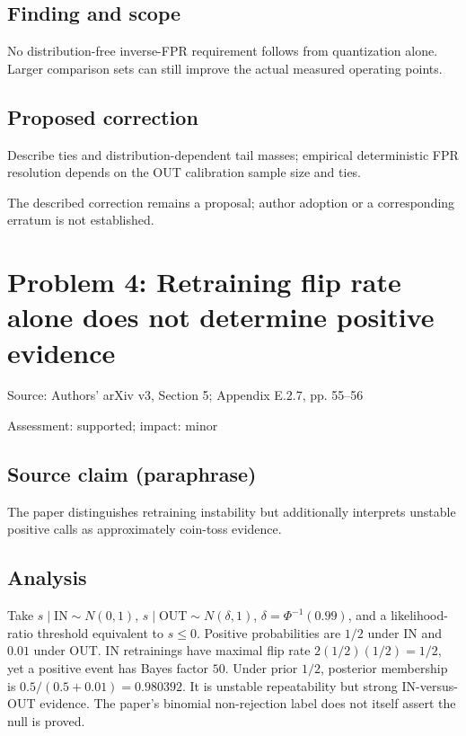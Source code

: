 \documentclass[11pt]{article}
\begin{document}
\subsection*{Finding and scope}

No distribution-free inverse-FPR requirement follows from quantization alone. Larger comparison sets can still improve the actual measured operating points.

\subsection*{Proposed correction}

Describe ties and distribution-dependent tail masses; empirical deterministic FPR resolution depends on the OUT calibration sample size and ties.

The described correction remains a proposal; author adoption or a corresponding erratum is not established.

\section*{Problem 4: Retraining flip rate alone does not determine positive evidence}

Source: Authors’ arXiv v3, Section 5; Appendix E.2.7, pp. 55–56

Assessment: supported; impact: minor

\subsection*{Source claim (paraphrase)}

The paper distinguishes retraining instability but additionally interprets unstable positive calls as approximately coin-toss evidence.

\subsection*{Analysis}

Take \(s\mid\mathrm{IN}\sim N(0,1)\), \(s\mid\mathrm{OUT}\sim N(\delta,1)\), \(\delta=\Phi^{-1}(0.99)\), and a likelihood-ratio threshold equivalent to \(s\le0\). Positive probabilities are \(1/2\) under IN and \(0.01\) under OUT. IN retrainings have maximal flip rate \(2(1/2)(1/2)=1/2\), yet a positive event has Bayes factor \(50\). Under prior \(1/2\), posterior membership is \(0.5/(0.5+0.01)=0.980392\). It is unstable repeatability but strong IN-versus-OUT evidence. The paper’s binomial non-rejection label does not itself assert the null is proved.
\end{document}
